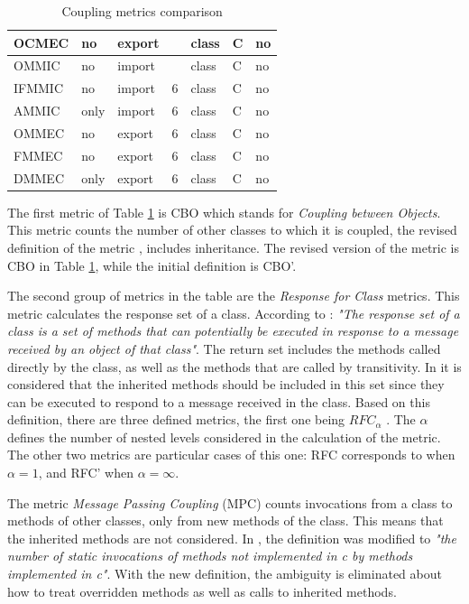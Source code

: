 \begin{table}[p]
\begin{center}
\begin{tabular}{|l|l|l|l|l|l|l|}
    OCMEC & no & export &  & class & C & no \\
    \hline
    OMMIC & no & import &  & class & C & no \\
    IFMMIC & no & import & 6 & class & C & no \\
    AMMIC & only & import & 6 & class & C & no \\
    OMMEC & no & export & 6 & class & C & no \\
    FMMEC & no & export & 6 & class & C & no \\
    DMMEC & only & export & 6 & class & C & no \\
    \hline
    \end{tabular}
    \end{center}
    \caption{Coupling metrics comparison}
    \label{table:coupling-metrics}
\end{table}

\bigskip\noindent
The first metric of Table \ref{table:coupling-metrics} is CBO which stands for \textit{Coupling between Objects}. This metric counts the number of other classes to which it is coupled, the revised definition of the metric \cite{chidamber1994metrics}, includes inheritance. The revised version of the metric is CBO in Table \ref{table:coupling-metrics}, while the initial definition is CBO'.

The second group of metrics in the table are the \textit{Response for Class} metrics. This metric calculates the response set of a class. According to \cite{chidamber1994metrics}: \textit{"The response set of a class is a set of methods that can potentially be executed in response to a message received by an object of that class"}. The return set includes the methods called directly by the class, as well as the methods that are called by transitivity. In \cite{briand1999unified} it is considered that the inherited methods should be included in this set since they can be executed to respond to a message received in the class. Based on this definition, there are three defined metrics, the first one being $RFC_\alpha$ \cite{churcher1995towards}. The $\alpha$ defines the number of nested levels considered in the calculation of the metric. The other two metrics are particular cases of this one: RFC corresponds to when $\alpha = 1$, and RFC' when $\alpha = \infty$.

The metric \textit{Message Passing Coupling} (MPC) \cite{li1993object} counts invocations from a class to methods of other classes, only from new methods of the class. This means that the inherited methods are not considered. In \cite{briand1999unified}, the definition was modified to \textit{"the number of static invocations of methods not implemented in c by methods implemented in c"}. With the new definition, the ambiguity is eliminated about how to treat overridden methods as well as calls to inherited methods.

